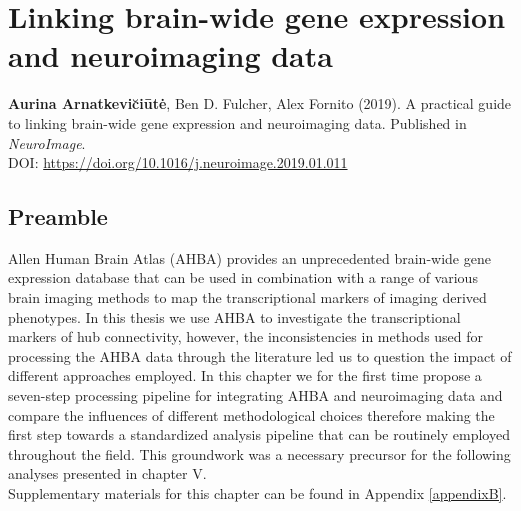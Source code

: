 \chapter{Linking brain-wide gene expression and neuroimaging data}
\label{ch:Chapter4}



\textbf{Aurina Arnatkevi\u{c}i\={u}t\.{e}},
Ben D. Fulcher,
Alex Fornito (2019).
A practical guide to linking brain-wide gene expression and neuroimaging data. Published in \textit{NeuroImage}.\\
DOI: \url{https://doi.org/10.1016/j.neuroimage.2019.01.011}

\section*{Preamble}
Allen Human Brain Atlas (AHBA) provides an unprecedented brain-wide gene expression database that can be used in combination with a range of various brain imaging methods to map the transcriptional markers of imaging derived phenotypes. In this thesis we use AHBA to investigate the transcriptional markers of hub connectivity, however, the inconsistencies in methods used for processing the AHBA data through the literature led us to question the impact of different approaches employed. In this chapter we for the first time propose a seven-step processing pipeline for integrating AHBA and neuroimaging data and compare the influences of different methodological choices therefore making the first step towards a standardized analysis pipeline that can be routinely employed throughout the field. This groundwork was a necessary precursor for the following analyses presented in chapter V.\\
Supplementary materials for this chapter can be found in Appendix \ref{appendixB}.

\newpage

